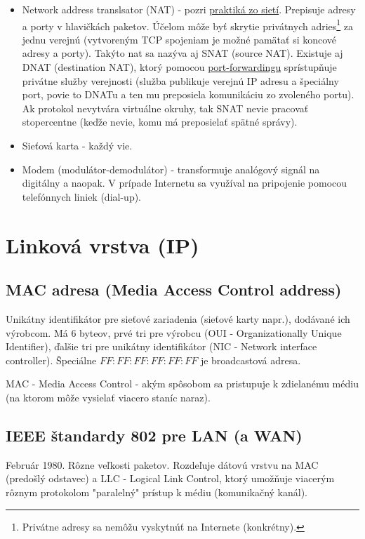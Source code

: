 \documentclass[10pt,a4paper]{article}
\begin{document}
\begin{itemize}
\label{NAT}
\item Network address translsator (NAT) - pozri \href{http://netlab.dcs.fmph.uniba.sk/siete/cviko8/}{praktiká zo sietí}. Prepisuje adresy a porty v hlavičkách paketov. Účelom môže byť skrytie privátnych adries\footnote{
Privátne adresy sa nemôžu vyskytnúť na Internete (konkrétny). 
} za jednu verejnú (vytvoreným TCP spojeniam je možné pamätať si koncové adresy a porty). Takýto nat sa nazýva aj SNAT (source NAT). Existuje aj DNAT (destination NAT), ktorý pomocou \href{http://en.wikipedia.org/wiki/Port_forwarding}{port-forwardingu} sprístupňuje privátne služby verejnosti (služba publikuje verejnú IP adresu a špeciálny port, povie to DNATu a ten mu preposiela komunikáciu zo zvoleného portu). Ak protokol nevytvára virtuálne okruhy, tak SNAT nevie pracovať stopercentne (keďže nevie, komu má preposielať spätné správy).  
\item Sieťová karta - každý vie. 
\item Modem (modulátor-demodulátor) - transformuje analógový signál na digitálny a naopak. V prípade Internetu sa využíval na pripojenie pomocou telefónnych liniek (dial-up).
\end{itemize}
 
\section{Linková vrstva (IP)}        
\subsection{MAC adresa (Media Access Control address)}     
Unikátny identifikátor pre sieťové zariadenia (sieťové karty napr.),
dodávané ich výrobcom. Má 6 byteov, prvé tri pre výrobcu (OUI - Organizationally Unique Identifier), ďalšie tri pre unikátny identifikátor (NIC - Network interface controller). Špeciálne $FF:FF:FF:FF:FF:FF$ je broadcastová adresa. 
          
MAC -  Media Access Control - akým spôsobom sa pristupuje k zdielanému médiu (na ktorom môže vysielať viacero staníc naraz).          
\subsection{IEEE štandardy 802 pre LAN (a WAN)}  
Február 1980. Rôzne veľkosti paketov. Rozdeľuje dátovú vrstvu na MAC  (predošlý odstavec) a LLC - Logical Link Control, ktorý umožňuje viacerým rôznym protokolom "paralelný" prístup k médiu (komunikačný kanál).
\end{document}

